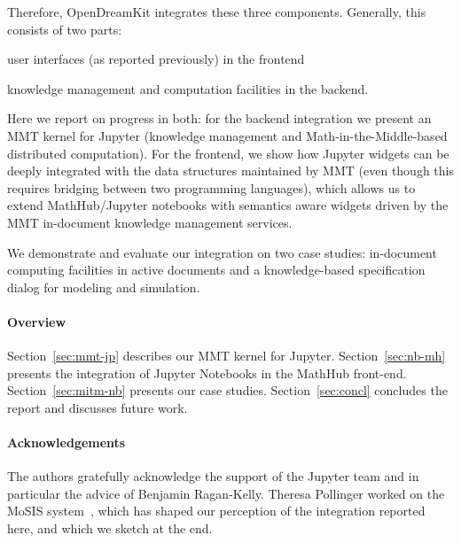 Therefore, OpenDreamKit integrates these three components.
Generally, this consists of two parts:
\begin{inparaenum}[\em a\rm )]
\item user interfaces (as reported previously) in the frontend
\item knowledge management and computation facilities in the backend.
\end{inparaenum}
Here we report on progress in both: for the backend integration we present an MMT kernel for Jupyter (knowledge management and Math-in-the-Middle-based distributed computation).
For the frontend, we show how Jupyter widgets can be deeply integrated with the data structures maintained by MMT (even though this requires bridging between two programming languages), which allows us to extend MathHub/Jupyter notebooks with semantics aware widgets driven by the MMT in-document knowledge management services.

We demonstrate and evaluate our integration on two case studies: in-document computing facilities in active documents and a knowledge-based specification dialog for modeling and simulation.

\paragraph{Overview}
Section~\ref{sec:mmt-jp} describes our MMT kernel for Jupyter.
Section~\ref{sec:nb-mh} presents the integration of Jupyter Notebooks in the MathHub front-end.
Section~\ref{sec:mitm-nb} presents our case studies.
Section~\ref{sec:concl} concludes the report and discusses future work.

\paragraph{Acknowledgements}
The authors gratefully acknowledge the support of the Jupyter team and in particular the advice of Benjamin Ragan-Kelly.
Theresa Pollinger worked on the MoSIS system~\cite{PolKohKoe:kacse18}, which has shaped our perception of the integration reported here, and which we sketch at the end. 


